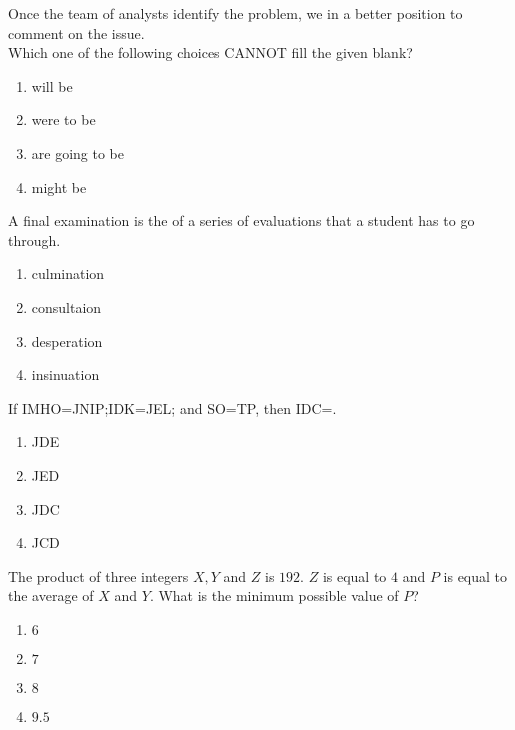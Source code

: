 \iffalse
\chapter{2019}
\author{AI24BTECH11020}
\section{ae}
\fi

	\item Once the team of analysts identify the problem, we \underline{\hspace{2cm}} in a better position to comment on the issue.\\Which one of the following choices CANNOT fill the given blank?
		\begin{enumerate}
			\item will be
			\item were to be
			\item are going to be 
			\item might be
		\end{enumerate}
	\item A final examination is the \underline{\hspace{2cm}} of a series of evaluations that a student has to go through.
		\begin{enumerate}                           
                        \item culmination                
                        \item consultaion               
                        \item desperation
                        \item insinuation
                \end{enumerate}

	\item If IMHO=JNIP;IDK=JEL; and SO=TP, then IDC=\underline{\hspace{2cm}}.
		\begin{enumerate}                           
                        \item JDE                  
                     \item JED
                        \item JDC
                        \item JCD
                \end{enumerate}
	\item The product of three integers $X,Y$ and $Z$ is $192$. $Z$ is equal to $4$ and $P$ is equal to the average of $X$ and $Y$. What is the minimum possible value of $P$?
		\begin{enumerate}                           
                        \item $6$                          
                        \item $7$                        
                        \item $8$
                        \item $9.5$
                \end{enumerate}

